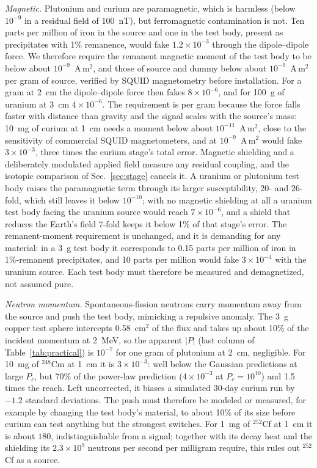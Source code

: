 \documentclass[aps,prd,onecolumn,superscriptaddress,floatfix,nofootinbib]{revtex4-2}
\newcommand{\nuc}[2]{$^{#1}$#2}
\begin{document}
\textit{Magnetic.} Plutonium and curium are paramagnetic, which is harmless (below $10^{-9}$ in a residual field
of 100~nT), but ferromagnetic contamination is not. Ten parts per million of iron in the source and one in the test
body, present as precipitates with 1\% remanence, would fake $1.2\times10^{-3}$ through the dipole--dipole force. We
therefore require the remanent magnetic moment of the test body to be below about $10^{-9}$~A\,m$^2$, and those of
source and dummy below about $10^{-9}$~A\,m$^2$ per gram of source, verified by SQUID magnetometry before
installation. For a gram at 2~cm the dipole--dipole force then fakes $8\times10^{-6}$, and for 100~g of uranium at
3~cm $4\times10^{-6}$. The requirement is per gram because the force falls faster with distance than gravity and the
signal scales with the source's mass: 10~mg of curium at 1~cm needs a moment below about $10^{-11}$~A\,m$^2$, close
to the sensitivity of commercial SQUID magnetometers, and at $10^{-9}$~A\,m$^2$ would fake $3\times10^{-3}$, three
times the curium stage's total error. Magnetic shielding and a deliberately modulated applied field
measure any residual coupling, and the isotopic comparison of Sec.~\ref{sec:stage} cancels it. A uranium or
plutonium test body raises the paramagnetic term through its larger susceptibility, 20- and 26-fold, which still
leaves it below $10^{-10}$; with no magnetic shielding at all a uranium test body facing the uranium source would
reach $7\times10^{-6}$, and a shield that reduces the Earth's field 7-fold keeps it below 1\% of that stage's error.
The remanent-moment requirement is unchanged, and it is demanding for any material: in a 3~g test body it
corresponds to 0.15 parts per million of iron in 1\%-remanent precipitates, and 10 parts per million would fake
$3\times10^{-4}$ with the uranium source. Each test body must therefore be measured and demagnetized, not assumed
pure.

\textit{Neutron momentum.} Spontaneous-fission neutrons carry momentum away from the source and push the test
body, mimicking a repulsive anomaly. The 3~g copper test sphere intercepts 0.58~cm$^2$ of the flux and takes up
about 10\% of the incident momentum at 2~MeV, so the apparent $|P|$ (last column of Table~\ref{tab:practical}) is
$10^{-7}$ for one gram of plutonium at 2~cm, negligible. For 10~mg of \nuc{248}{Cm} at 1~cm it is
$3\times10^{-3}$: well below the Gaussian predictions at large $P_c$, but 70\% of the power-law prediction
($4\times10^{-3}$ at $P_c=10^{10}$) and 1.5 times the reach. Left uncorrected, it biases a simulated 30-day curium run
by $-1.2$ standard deviations. The push must therefore be modeled or measured, for example by changing the test
body's material, to about 10\% of its size before curium can test anything but the strongest switches. For 1~mg of
\nuc{252}{Cf} at 1~cm it is about $180$, indistinguishable from a signal; together with its decay heat and the
shielding its $2.3\times10^{9}$ neutrons per second per milligram require, this rules out \nuc{252}{Cf} as a source.
\end{document}
